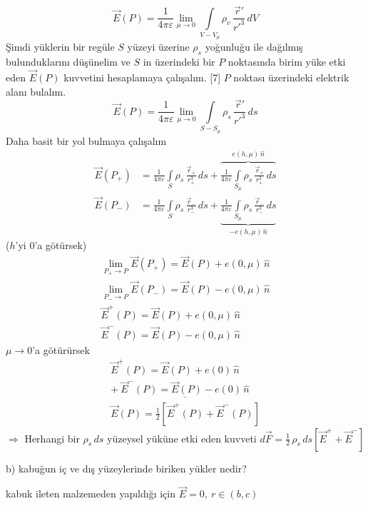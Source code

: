 \documentclass[11pt,a4paper]{article}
\begin{document}
\[ \vec E(P)=\frac{1}{4\pi\varepsilon}\lim_{\mu\to0}\int\limits_{V-V_\mu}\rho_v\,\frac{\vec r'}{r'^3}\,dV \]
Şimdi yüklerin bir regüle $S$ yüzeyi üzerine $\rho_s$ yoğunluğu ile dağılmış bulunduklarını düşünelim ve $S$ in üzerindeki bir $P$ noktasında birim yüke etki eden $\vec E(P)$ kuvvetini hesaplamaya çalışalım.
[7]
$P$ noktası üzerindeki elektrik alanı bulalım.
\[ \vec E(P)=\frac{1}{4\pi\varepsilon}\lim_{\mu\to0}\int\limits_{S-S_\mu}\rho_s\,\frac{\vec r'}{r'^3}\,ds \]
\textcolor{kirmizikalem}{Daha basit bir yol bulmaya çalışalım}
\begin{align*}
\vec E(P_+)&=\frac{1}{4\pi\varepsilon}\int\limits_S\rho_s\,\frac{\vec r_+}{r_+^3}\,ds+\overbrace{\frac{1}{4\pi\varepsilon}\int\limits_{S_\mu}\rho_s\,\frac{\vec r_+}{r_+^3}\,ds}^{e(h,\mu)\,\hat n}\\
\vec E(P_-)&=\frac{1}{4\pi\varepsilon}\int\limits_S\rho_s\,\frac{\vec r_-}{r_-^3}\,ds+\underbrace{\frac{1}{4\pi\varepsilon}\int\limits_{S_\mu}\rho_s\,\frac{\vec r_-}{r_-^3}\,ds}_{-e(h,\mu)\,\hat n}
\end{align*}
($h$'yi $0$'a götürsek)
\begin{gather*}
\lim_{P_+\to P}\vec E(P_+)=\vec E(P)+e(0,\mu)\,\hat n\\
\lim_{P_-\to P}\vec E(P_-)=\vec E(P)-e(0,\mu)\,\hat n\\
\vec E^{+}(P)=\vec E(P)+e(0,\mu)\,\hat n\\
\vec E^{-}(P)=\vec E(P)-e(0,\mu)\,\hat n
\end{gather*}
\textcolor{kirmizikalem}{$\mu\to0$'a götürürsek}
\begin{gather*}
\vec E^{+}(P)=\vec E(P)+e(0)\,\hat n\\
+\ \underline{\vec E^{-}(P)=\vec E(P)-e(0)\,\hat n}\\
\vec E(P)=\frac12\left[\vec E^{+}(P)+\vec E^{-}(P)\right]
\end{gather*}
\textcolor{kirmizikalem}{$\Rightarrow$ Herhangi bir $\rho_s\,ds$ yüzeysel yüküne etki eden kuvveti $d\vec F=\frac12\,\rho_s\,ds\left[\vec E^{+}+\vec E^{-}\right]$}


b) kabuğun iç ve dış yüzeylerinde biriken yükler nedir?

kabuk ileten malzemeden yapıldığı için $\vec E=0,\ r\in(b,c)$
\end{document}
